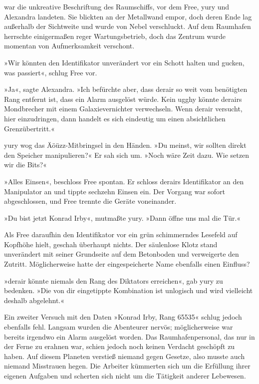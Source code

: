  war die unkreative Beschriftung des Raumschiffs, vor dem Free, yury und Alexandra landeten. Sie blickten an der Metallwand empor, doch deren Ende lag außerhalb der Sichtweite und wurde von Nebel verschluckt. Auf dem Raumhafen herrschte einigermaßen reger Wartungsbetrieb, doch das Zentrum wurde momentan von Aufmerksamkeit verschont.

»Wir könnten den Identifikator unverändert vor ein Schott halten und gucken, was passiert«, schlug Free vor.

»Ja«, sagte Alexandra. »Ich befürchte aber, dass derair so weit vom benötigten Rang entfernt ist, dass ein Alarm ausgelöst würde. Kein ugghy könnte derairs Mondbrecher mit einem Galaxievernichter verwechseln. Wenn derair versucht, hier einzudringen, dann handelt es sich eindeutig um einen absichtlichen Grenzübertritt.«

yury wog das Äöüzz-Mitbringsel in den Händen. »Du meinst, wir sollten direkt den Speicher manipulieren?« Er sah sich um. »Noch wäre Zeit dazu. Wie setzen wir die Bits?«

»Alles Einsen«, beschloss Free spontan. Er schloss derairs Identifikator an den Manipulator an und tippte sechzehn Einsen ein. Der Vorgang war sofort abgeschlossen, und Free trennte die Geräte voneinander.

»Du bist jetzt Konrad Irby«, mutmaßte yury. »Dann öffne uns mal die Tür.«

Als Free daraufhin den Identifikator vor ein grün schimmerndes Lesefeld auf Kopfhöhe hielt, geschah überhaupt nichts. Der säulenlose Klotz stand unverändert mit seiner Grundseite auf dem Betonboden und verweigerte den Zutritt. Möglicherweise hatte der eingespeicherte Name ebenfalls einen Einfluss?

»derair könnte niemals den Rang des Diktators erreichen«, gab yury zu bedenken. »Die von dir eingetippte Kombination ist unlogisch und wird vielleicht deshalb abgelehnt.«

Ein zweiter Versuch mit den Daten »Konrad Irby, Rang 65535« schlug jedoch ebenfalls fehl. Langsam wurden die Abenteurer nervös; möglicherweise war bereits irgendwo ein Alarm ausgelöst worden. Das Raumhafenpersonal, das nur in der Ferne zu erahnen war, schien jedoch noch keinen Verdacht geschöpft zu haben. Auf diesem Planeten verstieß niemand gegen Gesetze, also musste auch niemand Misstrauen hegen. Die Arbeiter kümmerten sich um die Erfüllung ihrer eigenen Aufgaben und scherten sich nicht um die Tätigkeit anderer Lebewesen.

